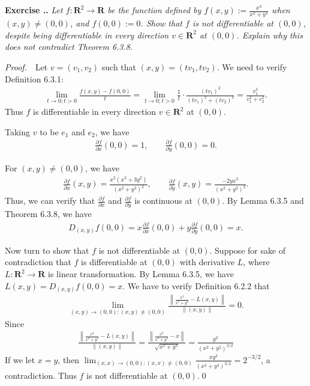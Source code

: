 \documentclass{book}
\newcommand{\pff}{\vspace{.25em}\noindent\emph{Proof.}~~}
\newcounter{Exercise}[section]
\renewcommand{\theExercise}{\thesection.\arabic{Exercise}.}
\newcommand{\new}{\vspace{1.5em}\noindent\textbf{Exercise \stepcounter{Exercise}\textbf{\theExercise}} }
\begin{document}
\new\emph{Let $f:\mathbf{R}^2 \to \mathbf{R}$ be the function defined by $f(x, y):=\frac{x^3}{x^2 + y^2}$ when $(x, y) \neq (0, 0)$, and $f(0, 0) := 0$. Show that $f$ is not differentiable at $(0, 0)$, despite being differentiable in every direction $v \in \mathbf{R}^2$ at $(0, 0)$. Explain why this does not contradict Theorem 6.3.8.}

\pff Let $v=(v_1,v_2)$ such that $(x, y) = (tv_1, tv_2)$. We need to verify Definition 6.3.1:
    \begin{align*}
        \lim_{t \to 0; t>0} \frac{f(x, y) - f(0, 0)}{t}
        = \lim_{t \to 0; t>0} \frac{1}{t} \cdot \frac{(tv_1)^3}{(tv_1)^2 + (tv_2)^2}
        = \frac{v_1^3}{v_1^2 + v_2^2}.
    \end{align*}
Thus $f$ is differentiable in every direction $v \in \mathbf{R}^2$ at $(0, 0)$.

Taking $v$ to be $e_1$ and $e_2$, we have
    \begin{align*}
        \frac{\partial f}{\partial x} (0, 0) = 1,\qquad
        \frac{\partial f}{\partial y} (0, 0) = 0.
    \end{align*}

For $(x, y) \neq (0, 0)$, we have
    \begin{align*}
        \frac{\partial f}{\partial x}(x,y) = \frac{x^2(x^2 + 3y^2)}{(x^2 + y^2)^2},\qquad
        \frac{\partial f}{\partial y}(x, y) = \frac{-2yx^3}{(x^2 + y^2)^2}.
    \end{align*}
Thus, we can verify that $\frac{\partial f}{\partial x}$ and $\frac{\partial f}{\partial y}$ is continuous at $(0, 0)$. By Lemma 6.3.5 and Theorem 6.3.8, we have
    \begin{align*}
        D_{(x, y)} f(0, 0) = x\frac{\partial f}{\partial x}(0, 0) + y\frac{\partial f}{\partial y}(0, 0)
        = x.
    \end{align*}

Now turn to show that $f$ is not differentiable at $(0, 0)$. Suppose for sake of contradiction that $f$ is differentiable at $(0, 0)$ with derivative $L$, where $L : \mathbf{R}^2 \to \mathbf{R}$ is linear transformation. By Lemma 6.3.5, we have $L(x,y) = D_{(x, y)}f(0, 0) = x$. We have to verify Definition 6.2.2 that 
    \begin{align*}
        \lim_{(x, y) \to (0, 0) : (x, y) \neq (0, 0)} \frac{\left\| \frac{x^3}{x^2 + y^2}-L(x, y) \right\|}{\|(x, y)\|} = 0.
    \end{align*}
Since
    \begin{align*}
        \frac{\left\| \frac{x^3}{x^2 + y^2}-L(x, y) \right\|}{\|(x, y)\|}
        = \frac{\left\| \frac{x^3}{x^2 + y^2} - x \right\|}{\sqrt{x^2 + y^2}}
        = \frac{y^2}{(x^2 + y^2)^{3/2}}
    \end{align*}
If we let $x = y$, then $\lim_{(x, x) \to (0, 0): (x, x) \neq (0, 0)} \frac{xy^2}{(x^2 + y^2)^{3/2}} = 2^{-3/2}$, a contradiction. Thus $f$ is not differentiable at $(0, 0)$.\qed
\end{document}

